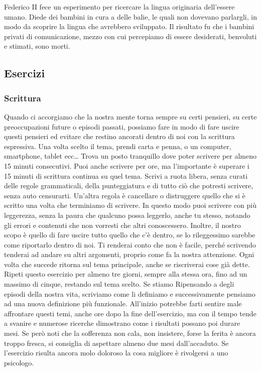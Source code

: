 \documentclass[12pt]{book} %
\begin{document}
\begin{mdframed}[linewidth=1pt]
Federico II fece un esperimento per ricercare la lingua originaria dell'essere umano. Diede dei
bambini in cura a delle balie, le quali non dovevano parlargli, in modo da scoprire la lingua che avrebbero sviluppato.
Il risultato fu che i bambini privati di comunicazione, mezzo con cui percepiamo di essere desiderati, benvoluti e
stimati, sono morti.
\end{mdframed}

\subsection{Esercizi}
\subsubsection{Scrittura}
Quando ci accorgiamo che la nostra mente torna sempre su certi pensieri, su certe preoccupazioni future o episodi
passati, possiamo fare in modo di fare uscire questi pensieri ed evitare che restino ancorati dentro di noi con la
scrittura espressiva. Una volta scelto il tema, prendi carta e penna, o un
computer, smartphone, tablet ecc… Trova un posto tranquillo dove poter scrivere per almeno 15 minuti consecutivi.
Puoi anche scrivere per ore, ma l'importante è superare i 15 minuti di scrittura continua su quel
tema. Scrivi a ruota libera, senza curati delle regole grammaticali, della punteggiatura e di tutto ciò che potresti
scrivere, senza auto censurarti. Un'altra regola è cancellare o distruggere quello che si è
scritto una volta che terminiamo di scrivere. In questo modo puoi scrivere con più leggerezza, senza la paura che
qualcuno possa leggerlo, anche tu stesso, notando gli errori e contenuti che non vorresti che altri conoscessero.
Inoltre, il nostro scopo è quello di fare uscire tutto quello che c'è dentro, se lo rileggessimo
sarebbe come riportarlo dentro di noi. Ti renderai conto che non è facile, perché scrivendo tenderai ad andare su altri
argomenti, proprio come fa la nostra attenzione. Ogni volta che succede ritorna sul tema principale, anche se
riscriverai cose già dette. Ripeti questo esercizio per almeno tre giorni, sempre alla stessa ora, fino ad un massimo
di cinque, restando sul tema scelto. 
Se stiamo Ripensando a degli episodi della nostra vita, scriviamo come li definiamo e successivamente pensiamo ad una nuova definizione più funzionale.
All'inizio potrebbe farti sentire male affrontare questi temi, anche ore dopo la fine dell'esercizio, ma con il tempo tende a svanire e numerose ricerche   
dimostrano come i risultati possano poi durare mesi. Se però noti che la sofferenza non cala, non insistere, forse la
ferita è ancora troppo fresca, si consiglia di aspettare almeno due mesi dall'accaduto. Se
l'esercizio risulta ancora molo doloroso la cosa migliore è rivolgersi a uno psicologo.
\end{document}

